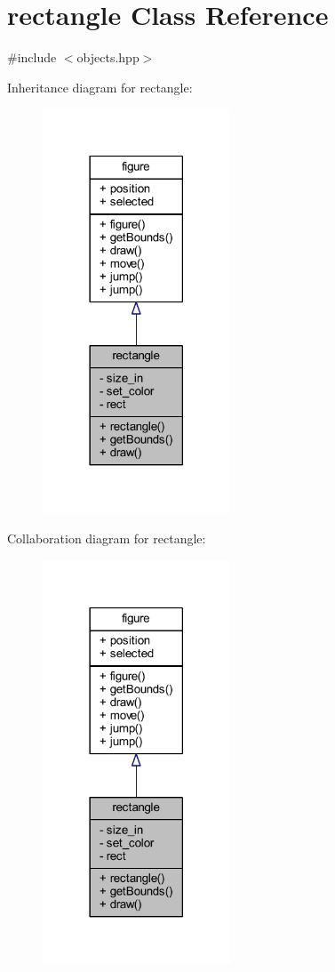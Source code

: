 \hypertarget{classrectangle}{}\section{rectangle Class Reference}
\label{classrectangle}


{\ttfamily \#include $<$objects.\+hpp$>$}



Inheritance diagram for rectangle\+:
\nopagebreak
\begin{figure}[H]
\begin{center}
\leavevmode
\includegraphics[width=158pt]{classrectangle__inherit__graph}
\end{center}
\end{figure}


Collaboration diagram for rectangle\+:
\nopagebreak
\begin{figure}[H]
\begin{center}
\leavevmode
\includegraphics[width=158pt]{classrectangle__coll__graph}
\end{center}
\end{figure}

